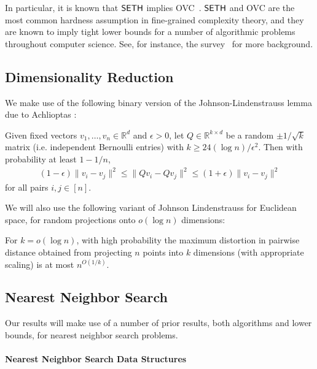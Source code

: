 In particular, it is known that $\mathsf{SETH}$ implies OVC~\cite{w05}.
$\mathsf{SETH}$ and OVC are the most common hardness assumption in fine-grained complexity theory, and they are known to imply tight lower bounds for a number of algorithmic problems throughout computer science. See, for instance, the survey~\cite{williams2018some} for more background.

\subsection{Dimensionality Reduction}

We make use of the following binary version of the Johnson-Lindenstrauss lemma due to Achlioptas \cite{a03}:

\begin{theorem}[\cite{jl84,a03}]\label{thm:jl}
Given fixed vectors $v_1,\hdots,v_n\in \mathbb{R}^d$ and $\epsilon > 0$, let $Q \in \mathbb{R}^{k\times d}$ be a random $\pm 1/\sqrt{k}$ matrix (i.e. independent Bernoulli entries) with $k\ge 24 (\log n)/\epsilon^2$. Then with probability at least $1 - 1/n$,
\begin{align*}
(1 - \epsilon)\|v_i - v_j\|^2\le \|Qv_i - Qv_j\|^2\le (1 + \epsilon)\|v_i - v_j\|^2
\end{align*}
for all pairs $i,j\in [n]$.
\end{theorem}

We will also use the following variant of Johnson Lindenstrauss for Euclidean space, for random projections onto $o(\log n)$ dimensions:

\begin{lemma}
\label{lem:low-dim-jl}  
For $k = o(\log n)$, with high probability the maximum distortion in pairwise distance obtained from projecting $n$ points into $k$ dimensions (with appropriate scaling) is at most $n^{O(1/k)}$.
\end{lemma}

\subsection{Nearest Neighbor Search}\label{sec:ann}

Our results will make use of a number of prior results, both algorithms and lower bounds, for nearest neighbor search problems.



\paragraph*{Nearest Neighbor Search Data Structures}

